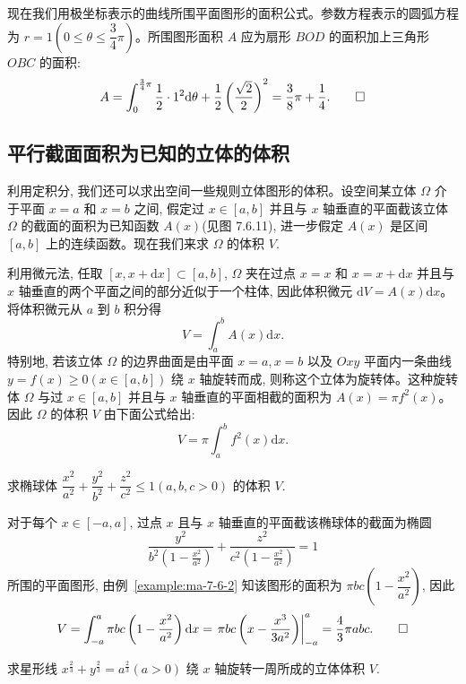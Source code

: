 \begin{solve}[{解法 2}]
现在我们用极坐标表示的曲线所围平面图形的面积公式。参数方程表示的圆弧方程为 $r=1\left(0\leq\theta\leq\dfrac{3}{4}\pi\right)$。所围图形面积 $A$ 应为扇形 $BOD$ 的面积加上三角形 $OBC$ 的面积:
\[
  A=\int_0^{\frac34\pi}\frac{1}{2}\cdot1^2\mathrm d\theta
  +\frac{1}{2}\left(\frac{\sqrt2}{2}\right)^2
  =\frac{3}{8}\pi+\frac{1}{4}.
\qedhere
\]
\end{solve}


\subsection{平行截面面积为已知的立体的体积}
\label{subsec:ma-7-6-5}

利用定积分, 我们还可以求出空间一些规则立体图形的体积。设空间某立体 $\Omega$ 介于平面 $x=a$ 和 $x=b$ 之间, 假定过 $x\in[a,b]$ 并且与 $x$ 轴垂直的平面截该立体 $\Omega$ 的截面的面积为已知函数 $A(x)$(见图 7.6.11), 进一步假定 $A(x)$ 是区间 $[a,b]$ 上的连续函数。现在我们来求 $\Omega$ 的体积 $V$.

利用微元法, 任取 $[x,x+\mathrm dx]\subset[a,b]$, $\Omega$ 夹在过点 $x=x$ 和 $x=x+\mathrm dx$ 并且与 $x$ 轴垂直的两个平面之间的部分近似于一个柱体, 因此体积微元 $\mathrm dV=A(x)\mathrm dx$。将体积微元从 $a$ 到 $b$ 积分得
\[
  V=\int_a^b A(x)\mathrm dx.
\]
特别地, 若该立体 $\Omega$ 的边界曲面是由平面 $x=a,x=b$ 以及 $Oxy$ 平面内一条曲线 $y=f(x)\geq0(x\in[a,b])$ 绕 $x$ 轴旋转而成, 则称这个立体为旋转体。这种旋转体 $\Omega$ 与过 $x\in[a,b]$ 并且与 $x$ 轴垂直的平面相截的面积为 $A(x)=\pi f^2(x)$。因此 $\Omega$ 的体积 $V$ 由下面公式给出:
\[
  V=\pi\int_a^b f^2(x)\mathrm dx.
\]

\begin{example}\label{example:ma-7-6-6}
求椭球体 $\dfrac{x^2}{a^2}+\dfrac{y^2}{b^2}+\dfrac{z^2}{c^2}\leq1(a,b,c>0)$ 的体积 $V$.
\end{example}


\begin{solve}
对于每个 $x\in[-a,a]$, 过点 $x$ 且与 $x$ 轴垂直的平面截该椭球体的截面为椭圆
\[
  \frac{y^2}{b^2\left(1-\frac{x^2}{a^2}\right)}
  +\frac{z^2}{c^2\left(1-\frac{x^2}{a^2}\right)}=1
\]
所围的平面图形, 由例~\ref{example:ma-7-6-2} 知该图形的面积为 $\pi bc\left(1-\dfrac{x^2}{a^2}\right)$, 因此
\[
  V=\int_{-a}^a \pi bc\left(1-\frac{x^2}{a^2}\right)\mathrm dx
  =\left.\pi bc\left(x-\frac{x^3}{3a^2}\right)\right|_{-a}^a
  =\frac{4}{3}\pi abc.
\qedhere
\]
\end{solve}


\begin{example}\label{example:ma-7-6-7}
求星形线 $x^{\frac23}+y^{\frac23}=a^{\frac23}(a>0)$ 绕 $x$ 轴旋转一周所成的立体体积 $V$.
\end{example}


